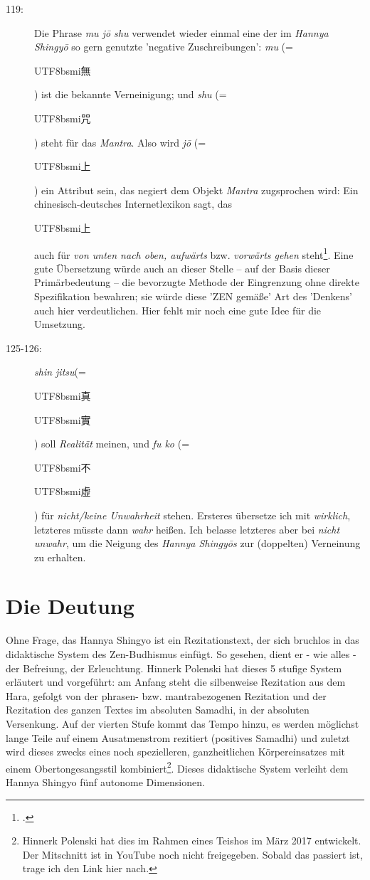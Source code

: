 \documentclass[
DIV=calc,
BCOR=5mm,
11pt,
headings=small,
oneside,
bibtotocnumbered,
english,ngerman]{scrartcl}
\newcommand{\cnbsmi}[1]{\begin{CJK}{UTF8}{bsmi}#1\end{CJK}}
\begin{document}
\begin{description}
  \item[119:] Die Phrase \emph{mu jō shu} verwendet wieder einmal eine der im
  \emph{Hannya Shingyō} so gern genutzte 'negative Zuschreibungen':
  \emph{mu} (= \cnbsmi{無}) ist die bekannte Verneinigung; und \emph{shu} (=
  \cnbsmi{咒}) steht für das \emph{Mantra}. Also wird \emph{jō} (= \cnbsmi{上})
  ein Attribut sein, das negiert dem Objekt \emph{Mantra} zugsprochen wird:
  Ein chinesisch-deutsches Internetlexikon sagt, das \cnbsmi{上} auch für
  \emph{von unten nach oben, aufwärts} bzw. \emph{vorwärts gehen}
  steht\footcite[vgl.][\nopage]{babla2016a}. Eine gute Übersetzung würde auch an
  dieser Stelle -- auf der Basis dieser Primärbedeutung -- die bevorzugte
  Methode der Eingrenzung ohne direkte Spezifikation bewahren; sie würde diese
  'ZEN gemäße' Art des 'Denkens' auch hier verdeutlichen. Hier fehlt mir noch
  eine gute Idee für die Umsetzung.

  \item[125-126:] \emph{shin jitsu}(= \cnbsmi{真} \cnbsmi{實}) soll
  \emph{Realität} meinen, und \emph{fu ko} (= \cnbsmi{不} \cnbsmi{虛} ) für
  \emph{nicht/keine Unwahrheit} stehen. Ersteres übersetze ich mit
  \emph{wirklich}, letzteres müsste dann \emph{wahr} heißen. Ich belasse
  letzteres aber bei \emph{nicht unwahr}, um die Neigung des \emph{Hannya
  Shingyōs} zur (doppelten) Verneinung zu erhalten.
\end{description}

\section{Die Deutung}

Ohne Frage, das Hannya Shingyo ist ein Rezitationstext, der sich bruchlos in das
didaktische System des Zen-Budhismus einfügt. So gesehen, dient er - wie alles -
der Befreiung, der Erleuchtung. Hinnerk Polenski hat dieses 5 stufige System
erläutert und vorgeführt: am Anfang steht die silbenweise Rezitation aus dem
Hara, gefolgt von der phrasen- bzw. mantrabezogenen Rezitation und der
Rezitation des ganzen Textes im absoluten Samadhi, in der absoluten Versenkung.
Auf der vierten Stufe kommt das Tempo hinzu, es werden möglichst lange Teile auf
einem Ausatmenstrom rezitiert (positives Samadhi) und zuletzt wird dieses
zwecks eines noch spezielleren, ganzheitlichen Körpereinsatzes mit einem
Obertongesangsstil kombiniert\footnote{Hinnerk Polenski hat dies im Rahmen
eines Teishos im März 2017 entwickelt. Der Mitschnitt ist in YouTube noch
nicht freigegeben. Sobald das passiert ist, trage ich den Link hier nach.}.
Dieses didaktische System verleiht dem Hannya Shingyo fünf autonome Dimensionen.
\end{document}
